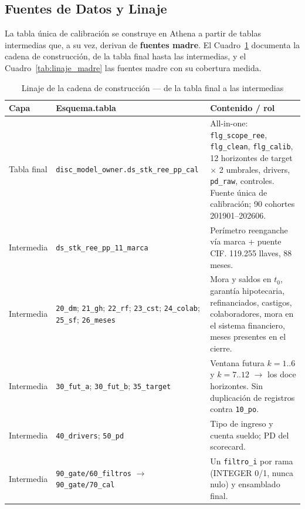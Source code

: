 \documentclass[12pt, a4paper]{article}
\begin{document}
\subsection{Fuentes de Datos y Linaje}
La tabla única de calibración se construye en Athena a partir de tablas intermedias que, a su
vez, derivan de \textbf{fuentes madre}. El Cuadro~\ref{tab:linaje} documenta la cadena de construcción,
de la tabla final hasta las intermedias, y el Cuadro~\ref{tab:linaje_madre} las fuentes madre con su cobertura medida.

\begin{table}[H]
\centering
\caption{Linaje de la cadena de construcción --- de la tabla final a las intermedias}
\label{tab:linaje}
\small
\setlength{\tabcolsep}{4pt}
\begin{tabular}{p{2.5cm}p{5.3cm}p{5.5cm}}
\toprule
\textbf{Capa} & \textbf{Esquema.tabla} & \textbf{Contenido / rol} \\
\midrule
Tabla final & \texttt{disc\_model\_owner.}\allowbreak\texttt{ds\_stk\_ree\_pp\_cal} & All-in-one: \texttt{flg\_scope\_ree}, \texttt{flg\_clean}, \texttt{flg\_calib}, 12 horizontes de target $\times$ 2 umbrales, drivers, \texttt{pd\_raw}, controles. Fuente única de calibración; 90 cohortes 201901--202606. \\
Intermedia & \texttt{ds\_stk\_ree\_pp\_11\_marca} & Perímetro reenganche vía marca + puente CIF. 119.255 llaves, 88 meses. \\
Intermedia & \texttt{20\_dm}; \texttt{21\_gh}; \texttt{22\_rf}; \texttt{23\_cst}; \texttt{24\_colab}; \texttt{25\_sf}; \texttt{26\_meses} & Mora y saldos en $t_0$, garantía hipotecaria, refinanciados, castigos, colaboradores, mora en el sistema financiero, meses presentes en el cierre. \\
Intermedia & \texttt{30\_fut\_a}; \texttt{30\_fut\_b}; \texttt{35\_target} & Ventana futura $k=1..6$ y $k=7..12$ $\to$ los doce horizontes. Sin duplicación de registros contra \texttt{10\_po}. \\
Intermedia & \texttt{40\_drivers}; \texttt{50\_pd} & Tipo de ingreso y cuenta sueldo; PD del scorecard. \\
Intermedia & \texttt{90\_gate/60\_filtros} $\to$ \texttt{90\_gate/70\_cal} & Un \texttt{filtro\_i} por rama (INTEGER 0/1, nunca nulo) y ensamblado final. \\
\bottomrule
\end{tabular}
\end{table}
\end{document}
